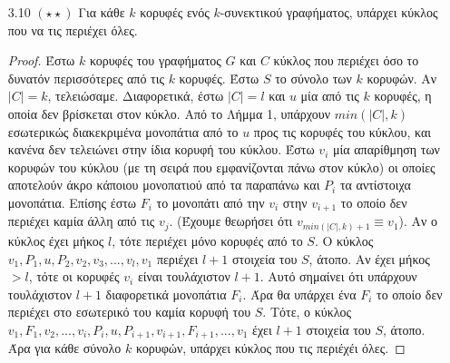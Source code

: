 \documentclass[a4paper, oneside, 11pt]{article}
\theoremstyle{definition}
\begin{document}
\begin{enumerate}
\begin{proof}
\begin{itemize}
               Έστω τώρα ότι $\{x, y\} \in E(G)$. Αν το γράφημα έχει μόνο
               3 κορυφές τότε είναι το $K_3$ και έχουμε τελειώσει.
               Διαφορετικά έστω ότι έχει τουλάχιστον άλλη μία κορυφή $w$
               η οποία συνδέεται στην $x$. Επειδή το γράφημα είναι δισυνεκτικό
               θα πρέπει η αφαίρεση της $x$ να μην το αποσυνδέει, συνεπώς
               θα πρέπει να υπάρχει μονοπάτι $P$ από την $w$ στην
               $y$ που να μην χρησιμοποιεί την κορυφή $x$. Tότε όμως
               μεταξύ της $x$ και της $y$ θα υπήραν 3 εσωτερικά διακεκριμένα
               μονοπάτια: 1) $(x, y)$, 2) $(x, u, y)$, 3) $P$. Άτοπο
               γιατί τώρα η αφαίρεση της $\{x, y\}$ διατηρεί το γράφημα
               δισυνεκτικό.\footnote{Υπάρχει περίπτωση το $P$ να χρησιμοποιεί
               την $u$ ώς ενδιάμεσο κόμβο. Σε αυτή την περίπτωση θεωρούμε
               το $P'$ από το $w$ στο $u$ και δείχνουμε ότι υπάρχουν
               3 εσωτερικά διακεκριμένα μονοπάτια από το $x$ στο $u$.}

               Άρα η $u$ είναι μη απλοϊδής κορυφή βαθμού 2 και μένει να
               δείξουμε ότι η διάλυσή της διατηρεί τη συνεκτικότητα. Αυτό
               προκύπτει από το θεώρημα Menger αφού ό,τι μονοπάτια υπήρχαν
               πριν μεταξύ κορυφών συνεχίζουν να υπάρχουν.
         \end{itemize}
      \end{proof}

   \item[3.10 $(\star\star)$]
Για κάθε $k$ κορυφές ενός $k$-συνεκτικού γραφήματος, υπάρχει κύκλος που να τις περιέχει όλες.
\begin{proof}
Έστω $k$ κορυφές του γραφήματος $G$ και $C$ κύκλος που περιέχει όσο το δυνατόν περισσότερες από τις $k$ κορυφές. Έστω $S$ το σύνολο των $k$ κορυφών. Αν $|C|=k$, τελειώσαμε. 
Διαφορετικά, έστω $|C|=l$ και $u$ μία από τις 
$k$ κορυφές, η οποία δεν 
βρίσκεται στον κύκλο. Από το Λήμμα 1, υπάρχουν $min(|C|,k)$ εσωτερικώς διακεκριμένα μονοπάτια από το $u$ προς τις κορυφές του κύκλου, και κανένα δεν τελειώνει στην ίδια κορυφή του κύκλου. Έστω $v_i$ μία
απαρίθμηση των κορυφών του κύκλου (με τη σειρά που εμφανίζονται πάνω στον κύκλο) οι οποίες αποτελούν άκρο κάποιου μονοπατιού από τα παραπάνω 
και $P_i$ τα αντίστοιχα μονοπάτια. Επίσης έστω $F_i$ το μονοπάτι από 
την $v_i$ στην $v_{i+1}$ το οποίο δεν περιέχει καμία άλλη από τις $v_j$. (Έχουμε θεωρήσει ότι $v_{min(|C|,k)+1}\equiv v_1$). Αν ο κύκλος έχει μήκος $l$, τότε περιέχει μόνο κορυφές από το $S$. Ο κύκλος
$v_1, P_1, u, P_2, v_2, v_3, ..., v_l, v_1$ περιέχει $l+1$ στοιχεία του $S$, άτοπο. Αν έχει μήκος $>l$, τότε οι κορυφές $v_i$ είναι τουλάχιστον $l+1$. Αυτό σημαίνει ότι υπάρχουν τουλάχιστον $l+1$
διαφορετικά μονοπάτια $F_i$. Άρα θα υπάρχει ένα $F_i$ το οποίο δεν περιέχει στο εσωτερικό του καμία κορυφή του $S$. Τότε, ο κύκλος $v_1, F_1, v_2, ..., v_i, P_i, u, P_{i+1}, v_{i+1}, F_{i+1}, ...,v_1$ 
έχει $l+1$ στοιχεία του $S$, άτοπο.
Άρα για κάθε σύνολο $k$ κορυφών, υπάρχει κύκλος που τις περιέχέι όλες.
\end{proof}


\end{enumerate}
\end{document}
